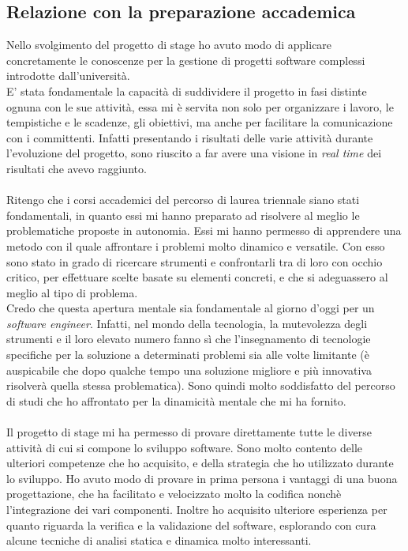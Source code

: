 \subsection{Relazione con la preparazione accademica}
Nello svolgimento del progetto di stage ho avuto modo di applicare concretamente le conoscenze per la gestione di progetti software complessi introdotte dall'università. \\
E' stata fondamentale la capacità di suddividere il progetto in fasi distinte ognuna con le sue attività, essa mi è servita non solo per organizzare i lavoro, le tempistiche e le scadenze, gli obiettivi, ma anche per facilitare la comunicazione con i committenti. Infatti presentando i risultati delle varie attività durante l'evoluzione del progetto, sono riuscito a far avere una visione in \textit{real time} dei risultati che avevo raggiunto. \\ \\ 
Ritengo che i corsi accademici del percorso di laurea triennale siano stati fondamentali, in quanto essi mi hanno preparato ad risolvere al meglio le problematiche proposte in autonomia. Essi mi hanno permesso di apprendere una metodo con il quale affrontare i problemi molto dinamico e versatile. Con esso sono stato in grado di ricercare strumenti e confrontarli tra di loro con occhio critico, per effettuare scelte basate su elementi concreti, e che si adeguassero al meglio al tipo di problema. \\
Credo che questa apertura mentale sia fondamentale al giorno d'oggi per un \textit{software engineer}. Infatti, nel mondo della tecnologia, la mutevolezza degli strumenti e il loro elevato numero fanno sì che l'insegnamento di tecnologie specifiche per la soluzione a determinati problemi sia alle volte limitante (è auspicabile che dopo qualche tempo una soluzione migliore e più innovativa risolverà quella stessa problematica). Sono quindi molto soddisfatto del percorso di studi che ho affrontato per la dinamicità mentale che mi ha fornito. \\ \\
Il progetto di stage mi ha permesso di provare direttamente tutte le diverse attività di cui si compone lo sviluppo software. Sono molto contento delle ulteriori competenze che ho acquisito, e della strategia che ho utilizzato durante lo sviluppo. Ho avuto modo di provare in prima persona i vantaggi di una buona progettazione, che ha facilitato e velocizzato molto la codifica nonchè l'integrazione dei vari componenti. Inoltre ho acquisito ulteriore esperienza per quanto riguarda la verifica e la validazione del software, esplorando con cura alcune tecniche di analisi statica e dinamica molto interessanti. \\ \\ 

